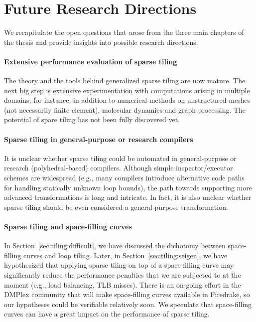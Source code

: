 \section{Future Research Directions}
We recapitulate the open questions that arose from the three main chapters of the thesis and provide insights into possible research directions.

\paragraph{Extensive performance evaluation of sparse tiling}
The theory and the tools behind generalized sparse tiling are now mature. The next big step is extensive experimentation with computations arising in multiple domains; for instance, in addition to numerical methods on unstructured meshes (not necessarily finite element), molecular dynamics and graph processing. The potential of spare tiling has not been fully discovered yet.

\paragraph{Sparse tiling in general-purpose or research compilers}
It is unclear whether sparse tiling could be automated in general-purpose or research (polyhedral-based) compilers. Although simple inspector/executor schemes are widespread (e.g., many compilers introduce alternative code paths for handling statically unknown loop bounds), the path towards supporting more advanced transformations is long and intricate. In fact, it is also unclear whether sparse tiling should be even considered a general-purpose transformation.

\paragraph{Sparse tiling and space-filling curves}
In Section~\ref{sec:tiling:difficult}, we have discussed the dichotomy between space-filling curves and loop tiling. Later, in Section~\ref{sec:tiling:seigen}, we have hypothesized that applying sparse tiling on top of a space-filling curve may significantly reduce the performance penalties that we are subjected to at the moment (e.g., load balancing, TLB misses). There is an on-going effort in the DMPlex community that will make space-filling curves available in Firedrake, so our hypotheses could be verifiable relatively soon. We speculate that space-filling curves can have a great impact on the performance of sparse tiling.


